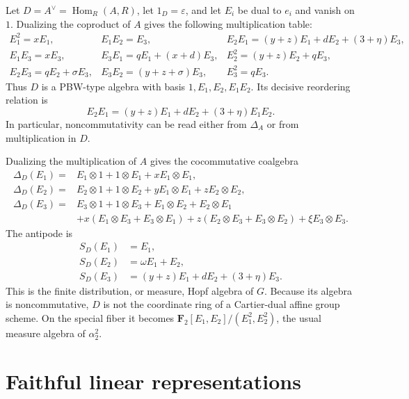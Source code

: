 \documentclass[11pt]{article}
\theoremstyle{remark}
\newcommand{\F}{\mathbf F}
\newcommand{\eps}{\varepsilon}
\begin{document}
Let \(D=A^\vee=\operatorname{Hom}_R(A,R)\), let \(1_D=\eps\), and let
\(E_i\) be dual to \(e_i\) and vanish on \(1\).  Dualizing the coproduct
of \(A\) gives the following multiplication table:
\begin{equation}\label{eq:dual-multiplication}
\begin{array}{lll}
E_1^2=xE_1,&E_1E_2=E_3,
 &E_2E_1=(y+z)E_1+dE_2+(3+\eta)E_3,\\
E_1E_3=xE_3,&E_3E_1=qE_1+(x+d)E_3,
 &E_2^2=(y+z)E_2+qE_3,\\
E_2E_3=qE_2+\sigma E_3,
 &E_3E_2=(y+z+\sigma)E_3,&E_3^2=qE_3.
\end{array}
\end{equation}
Thus \(D\) is a PBW-type algebra with basis
\(1,E_1,E_2,E_1E_2\).  Its decisive reordering relation is
\begin{equation}\label{eq:dual-reordering}
 E_2E_1=(y+z)E_1+dE_2+(3+\eta)E_1E_2.
\end{equation}
In particular, noncommutativity can be read either from \(\Delta_A\) or
from multiplication in \(D\).

Dualizing the multiplication of \(A\) gives the cocommutative coalgebra
\begin{align}
 \Delta_D(E_1)={}&E_1\otimes1+1\otimes E_1+xE_1\otimes E_1,
 \label{eq:dual-Delta1}\\
 \Delta_D(E_2)={}&E_2\otimes1+1\otimes E_2
  +yE_1\otimes E_1+zE_2\otimes E_2,
 \label{eq:dual-Delta2}\\
 \Delta_D(E_3)={}&E_3\otimes1+1\otimes E_3
  +E_1\otimes E_2+E_2\otimes E_1\nonumber\\
 &+x(E_1\otimes E_3+E_3\otimes E_1)
  +z(E_2\otimes E_3+E_3\otimes E_2)
  +\xi E_3\otimes E_3.\label{eq:dual-Delta3}
\end{align}
The antipode is
\begin{equation}\label{eq:dual-antipode}
\begin{aligned}
 S_D(E_1)&=E_1,\\
 S_D(E_2)&=\omega E_1+E_2,\\
 S_D(E_3)&=(y+z)E_1+dE_2+(3+\eta)E_3.
\end{aligned}
\end{equation}
This is the finite distribution, or measure, Hopf algebra of \(G\).
Because its algebra is noncommutative, \(D\) is not the coordinate ring of
a Cartier-dual affine group scheme.  On the special fiber it becomes
\(\F_2[E_1,E_2]/(E_1^2,E_2^2)\), the usual measure algebra of
\(\alpha_2^2\).

\section{Faithful linear representations}\label{sec:linear}
\end{document}

